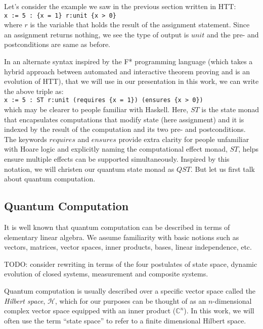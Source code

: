 \documentclass[adraft,creativecommons]{eptcs}
\theoremstyle{definition}
\theoremstyle{remark}
\begin{document}
Let's consider the example we saw in the previous section written in HTT:\medskip\\
\indent\indent\lstinline[language=QHaskell]!x := 5 : {x = 1} r:unit {x > 0}!
\medskip\\where $r$ is the variable that holds the result of the assignment statement. Since an assignment returns nothing, we see the type of output is $unit$ and the pre- and postconditions are same as before.

In an alternate syntax inspired by the F* programming language (which takes a hybrid approach between automated and interactive theorem proving and is an evolution of HTT), that we will use in our presentation in this work, we can write the above triple as:\medskip\\
\indent\indent\lstinline[language=QHaskell]!x := 5 : ST r:unit (requires {x = 1}) (ensures {x > 0})!
\medskip\\which may be clearer to people familiar with Haskell. Here, $ST$ is the state monad that encapsulates computations that modify state (here assignment) and it is indexed by the result of the computation and its two pre- and postconditions. The keywords $requires$ and $ensures$ provide extra clarity for people unfamiliar with Hoare logic and explicitly naming the computational effect monad, $ST$, helps ensure multiple effects can be supported simultaneously. Inspired by this notation, we will christen our quantum state monad as $QST$. But let us first talk about quantum computation.

\subsection{Quantum Computation}
It is well known that quantum computation can be described in terms of elementary linear algebra. We assume familiarity with basic notions such as vectors, matrices, vector spaces, inner products, bases, linear independence, etc.

TODO: consider rewriting in terms of the four postulates of state space, dynamic evolution of closed systems, measurement and composite systems.

Quantum computation is usually described over a specific vector space called the \textit{Hilbert space}, $\mathcal{H}$, which for our purposes can be thought of as an $n$-dimensional complex vector space equipped with an inner product ($\mathbb{C}^n$). In this work, we will often use the term ``state space'' to refer to a finite dimensional Hilbert space.
\end{document}

